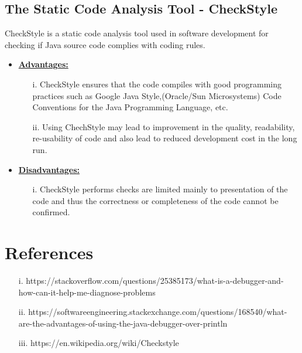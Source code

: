\documentclass[12pt]{report}
\begin{document}
\subsection{The Static Code Analysis Tool - CheckStyle}
CheckStyle is a static code analysis tool used in software development for checking if Java source code complies with coding rules.
\begin{itemize}
\item \textbf{\underline{Advantages:}}
	\begin{enumerate}
	\item[i.] CheckStyle ensures that the code compiles with good programming practices such as Google Java Style,(Oracle/Sun Microsystems) Code Conventions for the Java Programming Language, etc.
	\item[ii.] Using ChechStyle may lead to improvement in the quality, readability, re-usability of code and also lead to reduced development cost in the long run.
	\end{enumerate}
\item \textbf{\underline{Disadvantages:}}
	\begin{enumerate}
	\item[i.] CheckStyle performs checks are limited mainly to presentation of the code and thus the correctness or completeness of the code cannot be confirmed.\\
	\end{enumerate}
	
\end{itemize}

\section{References}
\begin{enumerate}
\item[i.] https://stackoverflow.com/questions/25385173/what-is-a-debugger-and-how-can-it-help-me-diagnose-problems
\item[ii.] https://softwareengineering.stackexchange.com/questions/168540/what-are-the-advantages-of-using-the-java-debugger-over-println
\item[iii.] https://en.wikipedia.org/wiki/Checkstyle
\end{enumerate}
\end{document}
